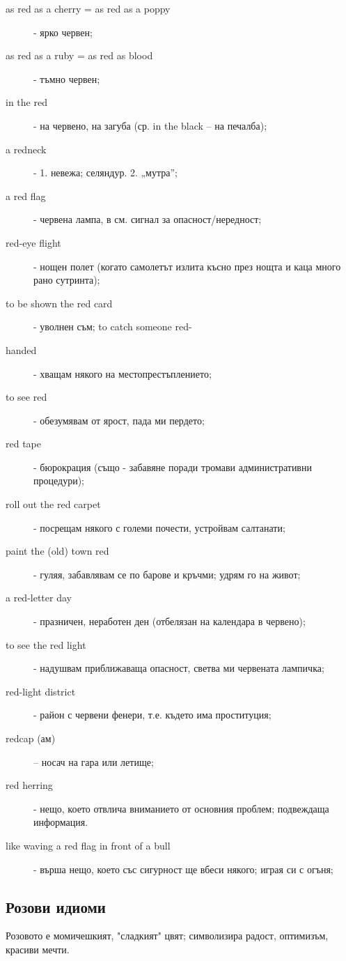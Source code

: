 \begin{description}
    
\item[as red as a cherry = as red as a poppy] - ярко червен;
\item[as red as a ruby = as red as blood] - тъмно червен;
\item[in the red] - на червено, на загуба (ср. in the black – на печалба);
\item[a redneck] - 1. невежа; селяндур. 2. „мутра”;
\item[a red flag] - червена лампа, в см. сигнал за опасност/нередност;
\item[red-eye flight] - нощен полет (когато самолетът излита късно през нощта и каца много рано сутринта);
\item[to be shown the red card] - уволнен съм;
to catch someone red-\item[handed] - хващам някого на местопрестъплението;
\item[to see red] - обезумявам от ярост, пада ми пердето;
\item[red tape] - бюрокрация (също - забавяне поради тромави административни процедури);
\item[roll out the red carpet] - посрещам някого с големи почести, устройвам салтанати;
\item[paint the (old) town red] - гуляя, забавлявам се по барове и кръчми; удрям го на живот;
\item[a red-letter day] - празничен, неработен ден (отбелязан на календара в червено);
\item[to see the red light] - надушвам приближаваща опасност, светва ми червената лампичка;
\item[red-light district] - район с червени фенери, т.е. където има проституция;
\item[redcap (ам)] – носач на гара или летище;
\item[red herring] - нещо, което отвлича вниманието от основния проблем; подвеждаща информация.
\item[like waving a red flag in front of a bull] - върша нещо, което със сигурност ще вбеси някого; играя си с огъня;
\end{description}

\subsection{Розови идиоми}
Розовото е момичешкият, "сладкият" цвят; символизира радост, оптимизъм, красиви мечти.

